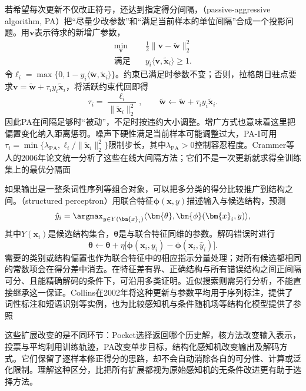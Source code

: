 若希望每次更新不仅改正符号，还达到指定得分间隔，（passive-aggressive algorithm, PA）把“尽量少改参数”和“满足当前样本的单位间隔”合成一个投影问题。用$\bm{v}$表示待求的新增广参数，
\begin{equation}
  \label{eq:classification-pa-projection}
  \begin{aligned}
    \min_{\bm{v}}\quad&
      \frac12\|\bm{v}-\tilde{\bm{w}}\|_2^2\\
    \text{满足}\quad&
      y_i\langle\bm{v},\tilde{\bm{x}}_i\rangle\geq1 .
  \end{aligned}
\end{equation}
令$\ell_i=\max\{0,1-y_i\langle\tilde{\bm{w}},\tilde{\bm{x}}_i\rangle\}$。约束已满足时参数不变；否则，拉格朗日驻点要求$\bm{v}=\tilde{\bm{w}}+\tau_i y_i\tilde{\bm{x}}_i$，将活跃约束代回即得
\[
  \tau_i=\frac{\ell_i}{\|\tilde{\bm{x}}_i\|_2^2},
  \qquad
  \tilde{\bm{w}}\leftarrow
    \tilde{\bm{w}}+\tau_i y_i\tilde{\bm{x}}_i .
\]
因此PA在间隔足够时“被动”，不足时按违约大小调整。增广方式也意味着这里把偏置变化纳入距离惩罚。噪声下硬性满足当前样本可能调整过大，PA-I可用$\tau_i=\min\{\lambda_{\mathrm{PA}},\ell_i/\|\tilde{\bm{x}}_i\|_2^2\}$限制步长，其中$\lambda_{\mathrm{PA}}>0$控制容忍程度。Crammer等人的2006年论文统一分析了这些在线大间隔方法；它们不是一次更新就求得全训练集上的最优分隔面

如果输出是一整条词性序列等组合对象，可以把多分类的得分比较推广到结构之间。（structured perceptron）用联合特征$\bm{\phi}(\bm{x},y)$描述输入与候选结构，预测
\[
  \hat y_i=\argmax_{y\in Y(\bm{x}_i)}
    \langle\bm{\theta},\bm{\phi}(\bm{x}_i,y)\rangle ,
\]
其中$Y(\bm{x}_i)$是候选结构集合，$\bm{\theta}$是与联合特征同维的参数。解码错误时进行
\[
  \bm{\theta}\leftarrow\bm{\theta}
    +\eta\bigl[\bm{\phi}(\bm{x}_i,y_i)
      -\bm{\phi}(\bm{x}_i,\hat y_i)\bigr].
\]
需要的类别或结构偏置也作为联合特征中的相应指示分量处理；对所有候选都相同的常数项会在得分差中消去。在特征差有界、正确结构与所有错误结构之间正间隔可分、且能精确解码的条件下，可沿用多类证明。近似搜索则需另行分析，不能直接继承这一保证。Collins在2002年将这种更新与参数平均用于序列标注，提供了词性标注和短语识别等实例，也为比较感知机与条件随机场等结构化模型提供了参照

这些扩展改变的是不同环节：Pocket选择返回哪个历史解，核方法改变输入表示，投票与平均利用训练轨迹，PA改变单步目标，结构化感知机改变输出及解码方式。它们保留了逐样本修正得分的思路，却不会自动消除各自的可分性、计算或泛化限制。理解这种区分，比把所有扩展都视为原始感知机的无条件改进更有助于选择方法。
